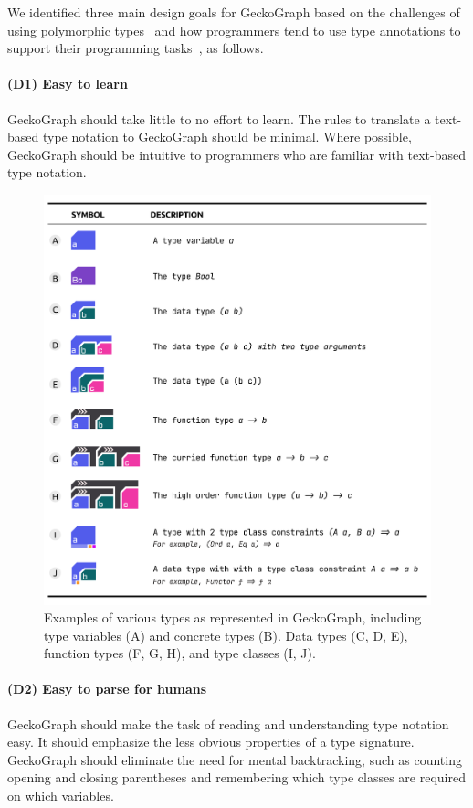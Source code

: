 \documentclass[preprint,12pt]{elsarticle}
\begin{document}
We identified three main design goals for GeckoGraph based on the challenges of using polymorphic types~\cite{Jun2000-ec, Jun2000-yu} and how programmers tend to use type annotations to support their programming tasks~\cite{Justin_Lubin2021-yy}, as follows. 

\paragraph{\textbf{(D1) Easy to learn}}\label{goal1} GeckoGraph should take little to no effort to learn. The rules to translate a text-based type notation to GeckoGraph should be minimal. Where possible, GeckoGraph should be intuitive to programmers who are familiar with text-based type notation.

\begin{figure}[!h]
  \includegraphics[width=\linewidth]{figures/Design}
  \caption{
        \label{fig:design}
        Examples of various types as represented in GeckoGraph, including type variables (A) and concrete types (B). Data types (C, D, E), function types (F, G, H), and type classes (I, J).
  }
\end{figure}

\paragraph{\textbf{(D2) Easy to parse for humans}}  \label{goal2} GeckoGraph should make the task of reading and understanding type notation easy. It should emphasize the less obvious properties of a type signature. GeckoGraph should eliminate the need for mental backtracking, such as counting opening and closing parentheses and remembering which type classes are required on which variables. 
\end{document}
